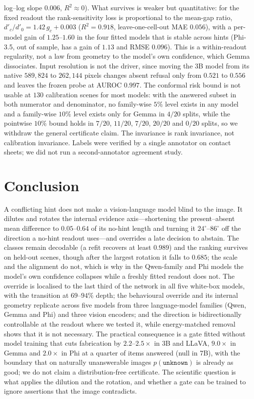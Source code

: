 \documentclass[10pt]{article}
\newcommand{\unknown}{\texttt{unknown}}
\newcommand{\punk}{p(\unknown)}
\begin{document}
log--log slope $0.006$, $R^2\approx0$). What survives is weaker but quantitative: for the fixed readout the rank-sensitivity loss is proportional to the mean-gap ratio, $d'_c/d'_0=1.42\,g_c+0.003$ ($R^2=0.918$, leave-one-cell-out MAE $0.056$), with a per-model gain of $1.25$--$1.60$ in the four fitted models that is stable across hints (Phi-3.5, out of sample, has a gain of $1.13$ and RMSE $0.096$). This is a within-readout regularity, not a law from geometry to the model's own confidence, which Gemma dissociates. Input resolution is not the driver, since moving the 3B model from its native $589{,}824$ to $262{,}144$ pixels changes absent refusal only from $0.521$ to $0.556$ and leaves the frozen probe at AUROC $0.997$. The conformal risk bound is not usable at $130$ calibration scenes for most models: with the answered subset in both numerator and denominator, no family-wise $5\%$ level exists in any model and a family-wise $10\%$ level exists only for Gemma in $4/20$ splits, while the pointwise $10\%$ bound holds in $7/20$, $11/20$, $7/20$, $20/20$ and $0/20$ splits, so we withdraw the general certificate claim. The invariance is rank invariance, not calibration invariance. Labels were verified by a single annotator on contact sheets; we did not run a second-annotator agreement study.

\section{Conclusion}

A conflicting hint does not make a vision-language model blind to the image. It dilutes and rotates the internal evidence axis---shortening the present--absent mean difference to $0.05$--$0.64$ of its no-hint length and turning it $24^\circ$--$86^\circ$ off the direction a no-hint readout uses---and overrides a late decision to abstain. The classes remain decodable (a refit recovers at least $0.989$) and the ranking survives on held-out scenes, though after the largest rotation it falls to $0.685$; the scale and the alignment do not, which is why in the Qwen-family and Phi models the model's own confidence collapses while a freshly fitted readout does not. The override is localised to the last third of the network in all five white-box models, with the transition at $69$--$94\%$ depth; the behavioural override and its internal geometry replicate across five models from three language-model families (Qwen, Gemma and Phi) and three vision encoders; and the direction is bidirectionally controllable at the readout where we tested it, while energy-matched removal shows that it is not necessary. The practical consequence is a gate fitted without model training that cuts fabrication by $2.2$--$2.5\times$ in 3B and LLaVA, $9.0\times$ in Gemma and $2.0\times$ in Phi at a quarter of items answered (null in 7B), with the boundary that on naturally unanswerable images $\punk$ is already as good; we do not claim a distribution-free certificate. The scientific question is what applies the dilution and the rotation, and whether a gate can be trained to ignore assertions that the image contradicts.
\end{document}
